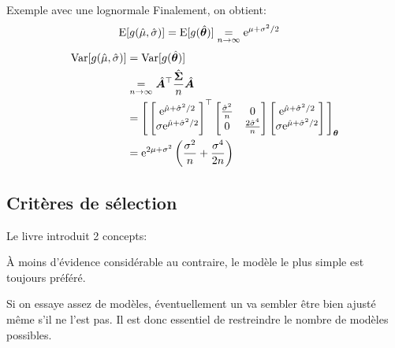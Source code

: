 \documentclass[10pt, french]{article}
\begin{document}
\begin{multicols*}{3}
\begin{examplebox}{Exemple avec une lognormale}
Finalement, on obtient:
\begin{align*}
	\text{E}[g(\hat{\mu}, \hat{\sigma})]	
	&=	\text{E}[g(\hat{\bm\theta})]
	\underset{n \rightarrow \infty}{=}	\mathrm{e}^{\mu + {\sigma}^{2}/2}	
\end{align*}
\begin{align*}
	\text{Var}[g(\hat{\mu}, \hat{\sigma})]	
	&=	\text{Var}[g(\hat{\bm\theta})]	\\
	&\underset{n \rightarrow \infty}{=}	\hat{\bm{A}}^{\top} \frac{\hat{\bm{\Sigma}}}{n} \hat{\bm{A}}	\\
	&=	\Bigg[
	\begin{bmatrix}
		\mathrm{e}^{\hat{\mu} + \hat{\sigma}^{2}/2}	\\
		\sigma\mathrm{e}^{\hat{\mu} + \hat{\sigma}^{2}/2}	\\
	\end{bmatrix}^{\top} 
	\begin{bmatrix}
		\frac{\hat\sigma^{2}}{n}	&	0						\\
		0					&	\frac{2\hat\sigma^{4}}{n}	\\
	\end{bmatrix}
	\begin{bmatrix}
		\mathrm{e}^{\hat{\mu} + \hat{\sigma}^{2}/2}	\\
		\sigma\mathrm{e}^{\hat{\mu} + \hat{\sigma}^{2}/2}	\\
	\end{bmatrix} 
		\Bigg] _{\bm{\theta}}	\\
	&=	\mathrm{e}^{2\mu + \sigma^{2}} \left( \frac{\sigma^{2}}{n} + \frac{\sigma^{4}}{2n} \right)
\end{align*}
\end{examplebox}

\setlength{\mathindent}{1cm}



\subsection*{Critères de sélection}

Le livre introduit 2 concepts:
\begin{description}
	\item[Parsimony:] À moins d'évidence considérable au contraire, le modèle le plus simple est toujours préféré.
	\item	Si on essaye assez de modèles, éventuellement un va sembler être bien ajusté même s'il ne l'est pas. 
	Il est donc essentiel de restreindre le nombre de modèles possibles.
\end{description}


\end{multicols*}
\end{document}

